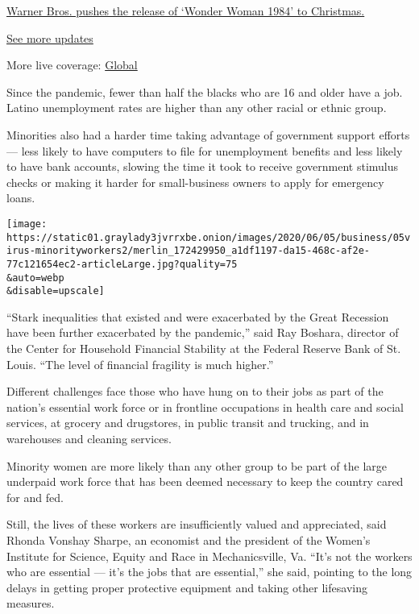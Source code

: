 \href{https://www.nytimes3xbfgragh.onion/live/2020/09/11/business/stock-market-today-coronavirus?action=click\&pgtype=Article\&state=default\&region=MAIN_CONTENT_1\&context=storylines_live_updates\#warner-bros-pushes-the-release-of-wonder-woman-1984-to-christmas}{Warner
Bros. pushes the release of `Wonder Woman 1984' to Christmas.}

\href{https://www.nytimes3xbfgragh.onion/live/2020/09/11/business/stock-market-today-coronavirus?action=click\&pgtype=Article\&state=default\&region=MAIN_CONTENT_1\&context=storylines_live_updates}{See
more updates}

More live coverage:
\href{https://www.nytimes3xbfgragh.onion/2020/09/11/world/covid-19-coronavirus.html?action=click\&pgtype=Article\&state=default\&region=MAIN_CONTENT_1\&context=storylines_live_updates}{Global}

Since the pandemic, fewer than half the blacks who are 16 and older have
a job. Latino unemployment rates are higher than any other racial or
ethnic group.

Minorities also had a harder time taking advantage of government support
efforts --- less likely to have computers to file for unemployment
benefits and less likely to have bank accounts, slowing the time it took
to receive government stimulus checks or making it harder for
small-business owners to apply for emergency loans.

\texttt{[image: https://static01.graylady3jvrrxbe.onion/images/2020/06/05/business/05virus-minorityworkers2/merlin\_172429950\_a1df1197-da15-468c-af2e-77c121654ec2-articleLarge.jpg?quality=75\\\&auto=webp\\\&disable=upscale]}

``Stark inequalities that existed and were exacerbated by the Great
Recession have been further exacerbated by the pandemic,'' said Ray
Boshara, director of the Center for Household Financial Stability at the
Federal Reserve Bank of St. Louis. ``The level of financial fragility is
much higher.''

Different challenges face those who have hung on to their jobs as part
of the nation's essential work force or in frontline occupations in
health care and social services, at grocery and drugstores, in public
transit and trucking, and in warehouses and cleaning services.

Minority women are more likely than any other group to be part of the
large underpaid work force that has been deemed necessary to keep the
country cared for and fed.

Still, the lives of these workers are insufficiently valued and
appreciated, said Rhonda Vonshay Sharpe, an economist and the president
of the Women's Institute for Science, Equity and Race in Mechanicsville,
Va. ``It's not the workers who are essential --- it's the jobs that are
essential,'' she said, pointing to the long delays in getting proper
protective equipment and taking other lifesaving measures.

